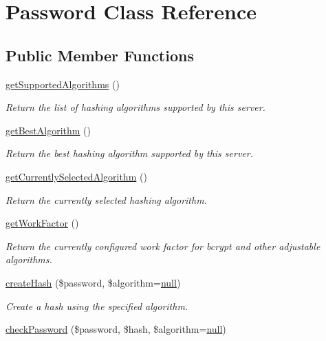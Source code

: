 \hypertarget{classPassword}{}\section{Password Class Reference}
\label{classPassword}
\subsection*{Public Member Functions}
\begin{DoxyCompactItemize}
\item 
\hyperlink{classPassword_a4983366e7b062e052e6d9f716aa3e59c}{get\+Supported\+Algorithms} ()
\begin{DoxyCompactList}\small\item\em Return the list of hashing algorithms supported by this server. \end{DoxyCompactList}\item 
\hyperlink{classPassword_a191be9b3e77eea80b6d97b7bfaaba288}{get\+Best\+Algorithm} ()
\begin{DoxyCompactList}\small\item\em Return the best hashing algorithm supported by this server. \end{DoxyCompactList}\item 
\hyperlink{classPassword_afd4c3a1daf246f73845a1f0c60cd17d8}{get\+Currently\+Selected\+Algorithm} ()
\begin{DoxyCompactList}\small\item\em Return the currently selected hashing algorithm. \end{DoxyCompactList}\item 
\hyperlink{classPassword_a2c41d8ed7334ffeef9a0b2778b86d8f7}{get\+Work\+Factor} ()
\begin{DoxyCompactList}\small\item\em Return the currently configured work factor for bcrypt and other adjustable algorithms. \end{DoxyCompactList}\item 
\hyperlink{classPassword_a85d7612e366f741aab750d10b415ca48}{create\+Hash} (\$password, \$algorithm=\hyperlink{modernizr_8min_8js_a286f9ec831c5e676eeb493248eab9575}{null})
\begin{DoxyCompactList}\small\item\em Create a hash using the specified algorithm. \end{DoxyCompactList}\item 
\hyperlink{classPassword_aa9ea10a8c7fab644cbe255eed95c06e8}{check\+Password} (\$password, \$hash, \$algorithm=\hyperlink{modernizr_8min_8js_a286f9ec831c5e676eeb493248eab9575}{null})

\end{DoxyCompactItemize}
